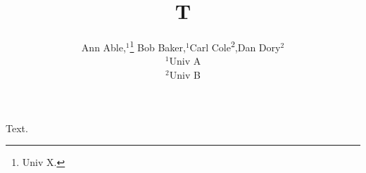 \documentclass{article}
\newcommand*\samethanks[1][\value{footnote}]{\footnotemark[#1]}
\begin{document}
\title{T}
\author{Ann Able,$^{1}$\thanks{Univ X.} Bob Baker,$^{1}$\samethanks[1] Carl Cole\textsuperscript{2},\footnotemark[1] Dan Dory$^{2}$\\
$^{1}$Univ A\\ $^{2}$Univ B}
\maketitle
Text.
\end{document}
